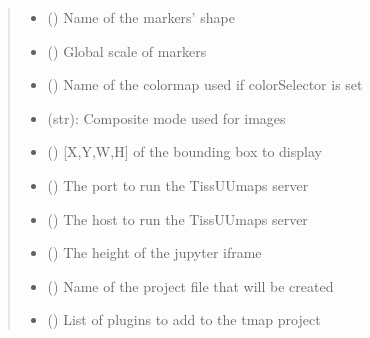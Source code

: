 \documentclass[letterpaper,10pt,english,openany,oneside]{sphinxmanual}
\begin{document}
\begin{fulllineitems}
\begin{quote}
\begin{description}
\begin{itemize}
\item {} 
\sphinxAtStartPar
{} () \textendash{} Name of the markers’ shape

\item {} 
\sphinxAtStartPar
{} () \textendash{} Global scale of markers

\item {} 
\sphinxAtStartPar
{} () \textendash{} Name of the colormap used if colorSelector is set

\item {} 
\sphinxAtStartPar
{} \textendash{} (str): Composite mode used for images

\item {} 
\sphinxAtStartPar
{} () \textendash{} {[}X,Y,W,H{]} of the bounding box to display

\item {} 
\sphinxAtStartPar
{} () \textendash{} The port to run the TissUUmaps server

\item {} 
\sphinxAtStartPar
{} () \textendash{} The host to run the TissUUmaps server

\item {} 
\sphinxAtStartPar
{} () \textendash{} The height of the jupyter iframe

\item {} 
\sphinxAtStartPar
{} () \textendash{} Name of the project file that will be created

\item {} 
\sphinxAtStartPar
{} () \textendash{} List of plugins to add to the tmap project

\end{itemize}


\end{description}
\end{quote}
\end{fulllineitems}
\end{document}
